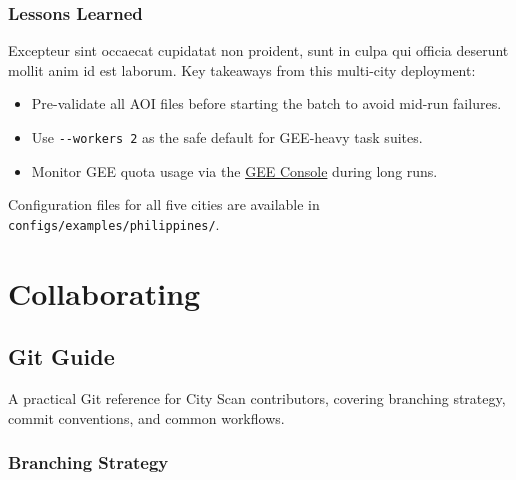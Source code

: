 \documentclass[
  letterpaper,
  DIV=11,
  numbers=noendperiod]{scrreprt}
\providecommand{\tightlist}{%
  \setlength{\itemsep}{0pt}\setlength{\parskip}{0pt}}
\begin{document}
\section{Lessons Learned}\label{lessons-learned}

Excepteur sint occaecat cupidatat non proident, sunt in culpa qui
officia deserunt mollit anim id est laborum. Key takeaways from this
multi-city deployment:

\begin{itemize}
\tightlist
\item
  Pre-validate all AOI files before starting the batch to avoid mid-run
  failures.
\item
  Use \texttt{-\/-workers\ 2} as the safe default for GEE-heavy task
  suites.
\item
  Monitor GEE quota usage via the
  \href{https://console.cloud.google.com/earth-engine}{GEE Console}
  during long runs.
\end{itemize}

\begin{tcolorbox}[enhanced jigsaw, arc=.35mm, bottomrule=.15mm, bottomtitle=1mm, breakable, colback=white, colbacktitle=quarto-callout-note-color!10!white, colframe=quarto-callout-note-color-frame, coltitle=black, left=2mm, leftrule=.75mm, opacityback=0, opacitybacktitle=0.6, rightrule=.15mm, title=\textcolor{quarto-callout-note-color}{\faInfo}\hspace{0.5em}{Note}, titlerule=0mm, toprule=.15mm, toptitle=1mm]

Configuration files for all five cities are available in
\texttt{configs/examples/philippines/}.

\end{tcolorbox}

\part{Collaborating}

\chapter{Git Guide}\label{git-guide}

A practical Git reference for City Scan contributors, covering branching
strategy, commit conventions, and common workflows.

\section{Branching Strategy}\label{branching-strategy}
\end{document}
